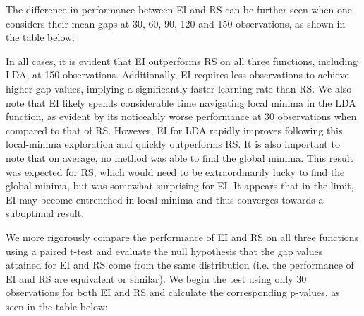 \documentclass[11pt]{article}
\numberwithin{equation}{section}
\begin{document}
The difference in performance between EI and RS can be further seen when one considers their mean gaps at 30, 60, 90, 120 and 150 observations, 
as shown in the table below:

In all cases, it is evident that EI outperforms RS on all three functions, including LDA, at 150 observations. 
Additionally, EI requires less observations to achieve higher gap values, implying a significantly faster learning rate than RS.
We also note that EI likely spends considerable time navigating local minima in the LDA function, 
as evident by its noticeably worse performance at 30 observations when compared to that of RS. 
However, EI for LDA rapidly improves following this local-minima exploration and quickly outperforms RS. 
It is also important to note that on average, no method was able to find the global minima. 
This result was expected for RS, which would need to be extraordinarily lucky to find the global minima, but was somewhat surprising for EI.
It appears that in the limit, EI may become entrenched in local minima and thus converges towards a suboptimal result. 

We more rigorously compare the performance of EI and RS on all three functions using a paired t-test and evaluate the null hypothesis that the gap values attained for EI and RS come from the same distribution (i.e. the performance of EI and RS are equivalent or similar).
We begin the test using only 30 observations for both EI and RS and calculate the corresponding p-values, as seen in the table below:
\end{document}
